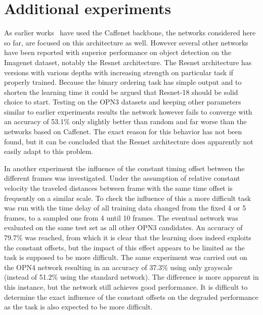 \section{Additional experiments}
As earlier works~\cite{misra2016,lee2017} have used the Caffenet backbone, the networks considered here so far, are focused on this architecture as well. However several other networks have been reported with superior performance on object detection on the Imagenet dataset, notably the Resnet architecture\cite{he2016}. The Resnet architecture has versions with various depths with increasing strength on particular task if properly trained. Because the binary ordering task has simple output and to shorten the learning time it could be argued that Resnet-18 should be solid choice to start. Testing on the OPN3 datasets and keeping other parameters similar to earlier experiments results the network however fails to converge with an accuracy of 53.1\% only slightly better than random and far worse than the networks based on Caffenet. The exact reason for this behavior has not been found, but it can be concluded that the Resnet architecture does apparently not easily adapt to this problem.

In another experiment the influence of the constant timing offset between the different frames was investigated. Under the assumption of relative constant velocity the traveled distances between frame with the same time offset is frequently on a similar scale. To check the influence of this a more difficult task was run with the time delay of all training data changed from the fixed 4 or 5 frames, to a sampled one from 4 until 10 frames. The eventual network was evaluated on the same test set as all other OPN3 candidates. An accuracy of 79.7\% was reached, from which it is clear that the learning does indeed exploits the constant offsets, but the impact of this effect appears to be limited as the task is supposed to be more difficult. The same experiment was carried out on the OPN4 network resulting in an accuracy of 37.3\% using only grayscale (instead of 51.2\% using the standard network). The difference is more apparent in this instance, but the network still achieves good performance. It is difficult to determine the exact influence of the constant offsets on the degraded performance as the task is also expected to be more difficult. 


